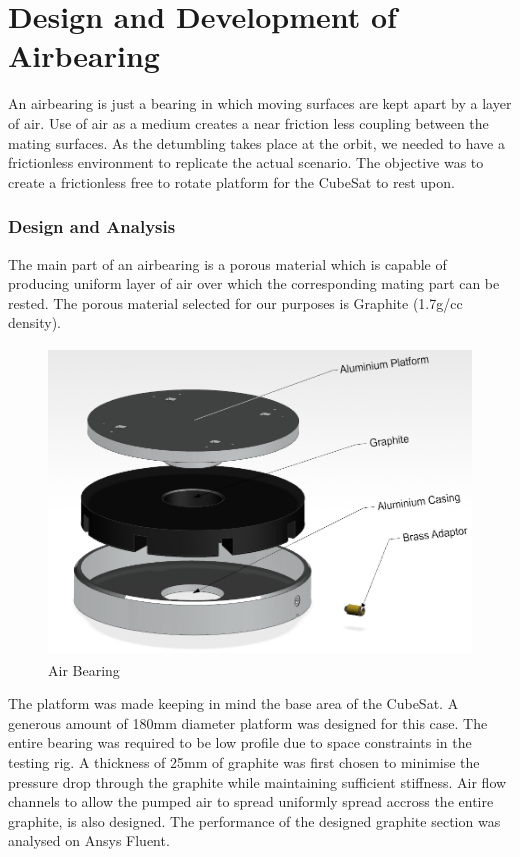 \chapter{Design and Development of Airbearing}

An airbearing is just a bearing in which moving surfaces are kept apart by a layer of air. Use of air as a medium creates a near friction less coupling between the mating surfaces. As the detumbling takes place at the orbit, we needed to have a frictionless environment to replicate the actual scenario. The objective was to create a frictionless free to rotate platform for the CubeSat to rest upon.

\subsection{Design and Analysis}

The main part of an airbearing is a porous material which is capable of producing uniform layer of air over which the corresponding mating part can be rested. The porous material selected for our purposes is Graphite (1.7g/cc density).

\begin{figure}[h!]
	\centering
	\includegraphics[width=4.5in,height=3.22in]{./images/airBearingStruct.png}
	\caption{Air Bearing}
	\label{fig-air-bearing-struct}
\end{figure}

The platform was made keeping in mind the base area of the CubeSat. A generous amount of 180mm diameter platform was designed for this case. The entire bearing was required to be low profile due to space constraints in the testing rig. A thickness of 25mm of graphite was first chosen to minimise the pressure drop through the graphite while maintaining sufficient stiffness. Air flow channels to allow the pumped air to spread uniformly spread accross the entire graphite, is also designed. The performance of the designed graphite section was analysed on Ansys Fluent.

